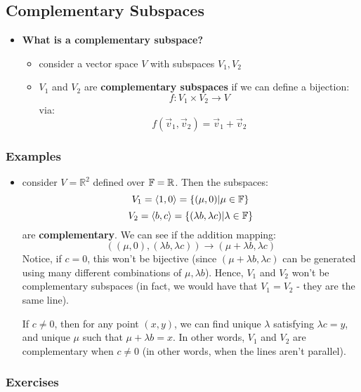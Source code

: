 \documentclass{exam}
\begin{document}
\subsection{Complementary Subspaces}

\begin{itemize}
    \item \textbf{What is a complementary subspace?}
    \begin{itemize}
        \item consider a vector space $V$ with subspaces $V_1, V_2$
        \item $V_1$ and $V_2$ are \textbf{complementary subspaces} if we can define a bijection:
        \[
        f: V_1 \times V_2 \to V
        \]
        via:
        \[
        f(\vec{v}_1, \vec{v}_2) = \vec{v}_1 + \vec{v}_2
        \]
    \end{itemize}
\end{itemize}

\subsubsection{Examples}

\begin{itemize}
    \item consider $V = \mathbb{R}^2$ defined over $\mathbb{F} = \mathbb{R}$. Then the subspaces:
    \[
    V_1 = \langle 1, 0\rangle = \{( \mu, 0) | \mu \in \mathbb{F}\}
    \]
    \[
    V_2 = \langle b, c \rangle = \{(\lambda b, \lambda c) | \lambda \in \mathbb{F}\}
    \]
    are \textbf{complementary}. We can see if the addition mapping:
    \[
    (( \mu, 0), (\lambda b, \lambda c)) \to (\mu + \lambda b, \lambda c)
    \]
    Notice, if $c = 0$, this won't be bijective (since $(\mu + \lambda b, \lambda c)$ can be generated using many different combinations of $\mu, \lambda b$). Hence, $V_1$ and $V_2$ won't be complementary subspaces (in fact, we would have that $V_1 = V_2$ - they are the same line).
    
    \bigskip
    
    If $c \neq 0$, then for any point $(x,y)$, we can find unique $\lambda$ satisfying $\lambda c = y$, and unique $\mu$ such that $\mu + \lambda b = x$. In other words, $V_1$ and $V_2$ are complementary when $c \neq 0$ (in other words, when the lines aren't parallel).
    
\end{itemize}

\subsubsection{Exercises}
\end{document}
